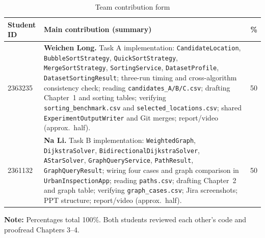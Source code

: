 \documentclass[12pt,a4paper,twocolumn,openany]{report}
\begin{document}
\begin{table}[t]
\centering
\caption{Team contribution form}
\scriptsize
\setlength{\tabcolsep}{4pt}
\begin{tabularx}{\textwidth}{@{}p{2.2cm}Xr@{}}
\toprule
Student ID & Main contribution (summary) & \% \\
\midrule
2363235 &
\textbf{Weichen Long.} Task A implementation: \texttt{CandidateLocation}, \texttt{BubbleSortStrategy}, \texttt{QuickSortStrategy}, \texttt{MergeSortStrategy}, \texttt{SortingService}, \texttt{DatasetProfile}, \texttt{DatasetSortingResult}; three-run timing and cross-algorithm consistency check; reading \texttt{candidates\_A/B/C.csv}; drafting Chapter~1 and sorting tables; verifying \texttt{sorting\_benchmark.csv} and \texttt{selected\_locations.csv}; shared \texttt{ExperimentOutputWriter} and Git merges; report/video (approx.\ half). &
50 \\
2361132 &
\textbf{Na Li.} Task B implementation: \texttt{WeightedGraph}, \texttt{DijkstraSolver}, \texttt{BidirectionalDijkstraSolver}, \texttt{AStarSolver}, \texttt{GraphQueryService}, \texttt{PathResult}, \texttt{GraphQueryResult}; wiring four cases and graph comparison in \texttt{UrbanInspectionApp}; reading \texttt{paths.csv}; drafting Chapter~2 and graph table; verifying \texttt{graph\_cases.csv}; Jira screenshots; PPT structure; report/video (approx.\ half). &
50 \\
\bottomrule
\end{tabularx}
\end{table}

\noindent\textbf{Note:} Percentages total 100\%. Both students reviewed each other's code and proofread Chapters 3--4.
\end{document}
